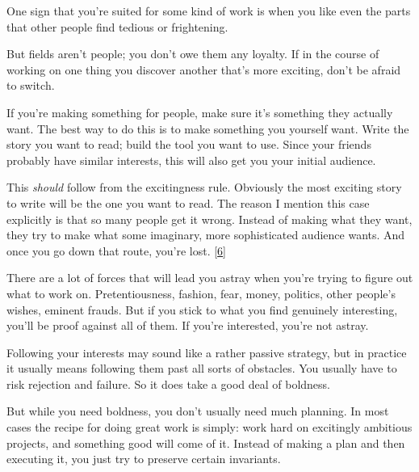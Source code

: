 One sign that you're suited for some
                  kind of work is when you like even the parts that other people
                  find tedious or frightening.

But fields aren't
                  people; you don't owe them any loyalty. If in the course of
                  working on one thing you discover another that's more
                  exciting, don't be afraid to switch.

If you're
                  making something for people, make sure it's something they
                  actually want. The best way to do this is to make something
                  you yourself want. Write the story you want to read; build the
                  tool you want to use. Since your friends probably have similar
                  interests, this will also get you your initial audience.

This
                  \emph{should} follow from the excitingness rule. Obviously the
                  most exciting story to write will be the one you want to read.
                  The reason I mention this case explicitly is that so many
                  people get it wrong. Instead of making what they want, they
                  try to make what some imaginary, more sophisticated audience
                  wants. And once you go down that route, you're lost.
                  [\href{\#f6n}{6}]

There are a lot of forces that will lead you
                  astray when you're trying to figure out what to work on.
                  Pretentiousness, fashion, fear, money, politics, other
                  people's wishes, eminent frauds. But if you stick to what you
                  find genuinely interesting, you'll be proof against all of
                  them. If you're interested, you're not astray.






                  Following your interests may sound like a rather passive
                  strategy, but in practice it usually means following them past
                  all sorts of obstacles. You usually have to risk rejection and
                  failure. So it does take a good deal of boldness.

But
                  while you need boldness, you don't usually need much planning.
                  In most cases the recipe for doing great work is simply: work
                  hard on excitingly ambitious projects, and something good will
                  come of it. Instead of making a plan and then executing it,
                  you just try to preserve certain invariants.


